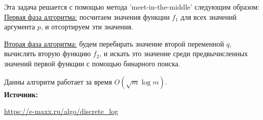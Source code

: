 \documentclass[12pt,a4paper]{scrartcl}
\begin{document}
Эта задача решается с помощью метода 'meet-in-the-middle' следующим образом:\\

\underline{Первая фаза алгоритма:} посчитаем значения функции $f_1$ для всех значений аргумента $p$, и отсортируем эти значения.

\underline{Вторая фаза алгоритма:} будем перебирать значение второй переменной $q$, вычислять вторую функцию $f_2$, и искать это значение среди предвычисленных значений первой функции с помощью бинарного поиска.

Данны алгоритм работает за время $O(\sqrt{m}\log{m})$.\\

\textbf{Источник:}

\href{https://e-maxx.ru/algo/discrete_log}{https://e-maxx.ru/algo/discrete\_log}
	
\end{document}
